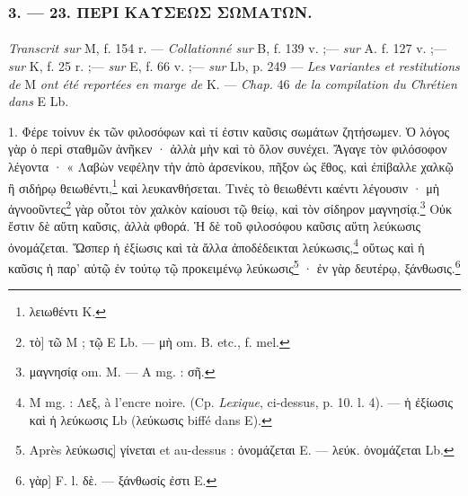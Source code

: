 \documentclass[landscape, a4paper, 11pt, oneside, polutonikogreek, french]{article}
\begin{document}
\bigskip
\centerline{\EightStarTaper}
\centerline{\EightStarTaper\EightStarTaper}
\bigskip

\subsubsection{3. --- 23. ΠΕΡΙ ΚΑΥΣΕΩΣ ΣΩΜΑΤΩΝ.}
\paragraph{}
\emph{Transcrit sur} M, f. 154 r. --- \emph{Collationné sur} B, f. 139 v. ;--- \emph{sur} A. f. 127 v. ;--- \emph{sur} K, f. 25 r. ;--- \emph{sur} E, f. 66 v. ;--- \emph{sur} Lb, p. 249 --- \emph{Les νariantes et restitutions de} M \emph{ont été reportées en marge de} K. --- \emph{Chap.} 46 \emph{de la compilation du Chrétien dans} E Lb.

\bigskip

1. Φέρε τοίνυν ἐκ τῶν φιλοσόφων καὶ τί ἐστιν καῦσις σωμάτων ζητήσωμεν. Ὁ λόγος γὰρ ὁ περὶ σταθμῶν ἀνῆκεν · ἀλλὰ μὴν καὶ τὸ ὅλον συνέχει. Ἄγαγε τὸν φιλόσοφον λέγοντα · « Λαβὼν νεφέλην τὴν ἀπὸ ἀρσενίκου, πῆξον ὡς ἔθος, καὶ ἐπίβαλλε χαλκῷ ἢ σιδήρῳ θειωθέντι,\footnote{λειωθέντι K.} καὶ λευκανθήσεται. Τινὲς τὸ θειωθέντι καέντι λέγουσιν · μὴ ἀγνοοῦντες\footnote{τὸ] τῶ M ; τῷ E Lb. --- μὴ om. B. etc., f. mel.} γὰρ οὗτοι τὸν χαλκὸν καίουσι τῷ θείῳ, καὶ τὸν σίδηρον μαγνησίᾳ.\footnote{μαγνησίᾳ om. M. --- A mg. : σῆ.} Οὐκ ἔστιν δὲ αὕτη καῦσις, ἀλλὰ φθορά. Ἡ δὲ τοῦ φιλοσόφου καῦσις αὕτη λεύκωσις ὀνομάζεται. Ὥσπερ ἡ ἐξίωσις καὶ τὰ ἄλλα ἀποδέδεικται λεύκωσις,\footnote{M mg. : Λεξ, à l'encre noire. (Cp. \emph{Lexique}, ci-dessus, p. 10. l. 4). --- ἡ ἐξίωσις καὶ ἡ λεύκωσις Lb (λεύκωσις biffé dans E).} οὕτως καὶ ἡ καῦσις ἡ παρ' αὐτῷ ἐν τούτῳ τῷ προκειμένῳ λεύκωσις\footnote{Après λεύκωσις] γίνεται et au-dessus : ὀνομάζεται E. --- λεύκ. ὀνομάζεται Lb.} · ἐν γὰρ δευτέρῳ, ξάνθωσις.\footnote{γὰρ] F. l. δὲ. --- ξάνθωσίς ἐστι E.}
\end{document}
